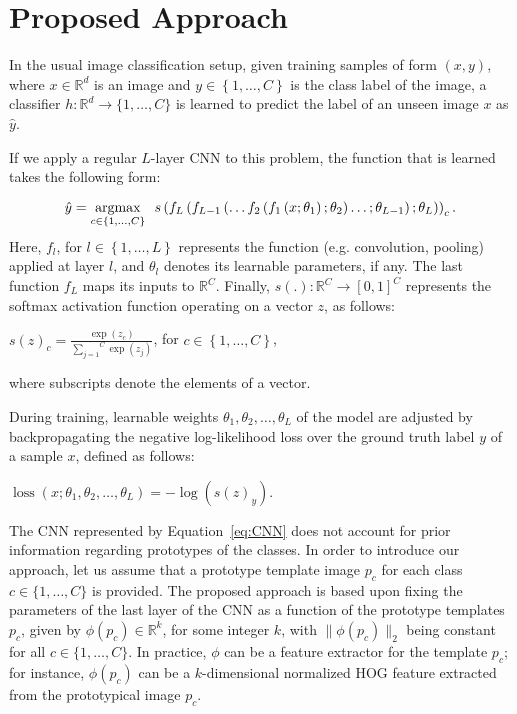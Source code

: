 \documentclass{bmvc2k}
\begin{document}
\section{\label{sec:Proposed-Approach}Proposed Approach}

In the usual image classification setup, given training samples of form
$(x, y)$, where $x \in \mathbb{R}^d$ is an image and $y \in
\left\{1,\ldots,C\right\}$ is the class label of the image, a classifier $h : \mathbb{R}^d \to \{1,\ldots,C\}$ 
is learned to predict the label of an unseen image $x$ as $\hat{y}$.

If we apply a regular $L$-layer
CNN to this problem, the function that is learned takes the following form:

\begin{equation}
\hat{y}=\operatornamewithlimits{argmax}_{c\in\{1,\ldots,C\}}\enspace
s\left(f_{L}\left(f_{L-1}\left(\ldots f_{2}\left(f_{1}\left(x;\theta_{1}\right);
\theta_{2}\right)\ldots;\theta_{L-1}\right);\theta_{L}\right)\right)_c.\label{eq:CNN}
\end{equation}Here, $f_{l}$, for $l\in\left\{ 1,\ldots ,L\right\} $ represents the function
(e.g. convolution, pooling) applied at layer $l$, and $\theta_{l}$ denotes its
learnable parameters, if any. The last function $f_L$ maps its inputs to
$\mathbb{R}^C$. Finally, $s(.) : \mathbb{R}^C \to [0, 1]^C$ represents the
softmax activation function operating on a vector $z$, as follows: 

\begin{center}
$s(z)_{c}=\frac{\exp\left(z_{c}\right)}{\overset{C}{\underset{j=1}{\sum}}\exp\left(z_{j}\right)}$,
for $c\in\left\{ 1,\ldots ,C\right\} $,
\par\end{center}
where subscripts denote the elements of a vector.

During training, learnable weights $\theta_1, \theta_2, \ldots, \theta_L$ of the model are adjusted 
by backpropagating the negative log-likelihood loss over the ground truth label
${y}$ of a sample $x$, defined as follows:
\begin{center}
$\operatorname{loss}(x; \theta_1, \theta_2, \ldots, \theta_L) =
-\log(s(z)_{{y}}).$
\end{center}

The CNN represented by Equation~\eqref{eq:CNN} does not account for prior
information regarding prototypes of the classes. In order to introduce our
approach, let us assume that a prototype template image $p_{c}$ for each class
$c \in \{1,\ldots,C\}$ is provided. The proposed approach is based upon fixing the parameters of
the last layer of the CNN as a function of the prototype templates $p_c$, given by 
$\phi(p_{c})\in\mathbb{R}^{k}$, for some integer $k$, with $\|\phi(p_c)\|_2$ being constant for all $c
\in \{1,\ldots,C\}$. In practice, $\phi$ can be a feature extractor for the
template $p_c$; for instance, $\phi(p_c)$ can be a $k$-dimensional normalized HOG feature extracted from the
prototypical image $p_c$.
\end{document}
